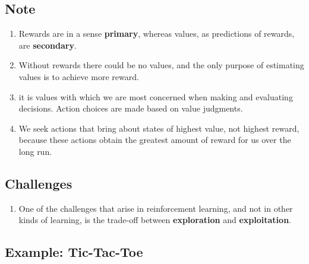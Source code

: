 \subsection*{Note \cite{drl-1}}
\begin{enumerate}
    \item Rewards are in a sense \textbf{primary}, whereas values, as predictions of rewards, are \textbf{secondary}.

    \item Without rewards there could be no values, and the only purpose of estimating values is to achieve more reward.

    \item it is values with which we are most concerned when making and evaluating decisions. Action choices are made based on value judgments.

    \item We seek actions that bring about states of highest value, not highest reward, because these actions obtain the greatest amount of reward for us over the long run.

    
\end{enumerate}


\subsection*{Challenges \cite{drl-1}}
\begin{enumerate}
    \item[] One of the challenges that arise in reinforcement learning, and not in other kinds of learning, is the trade-off between \textbf{exploration} and \textbf{exploitation}.

    
\end{enumerate}



\subsection{Example: Tic-Tac-Toe \cite{drl-1}}

